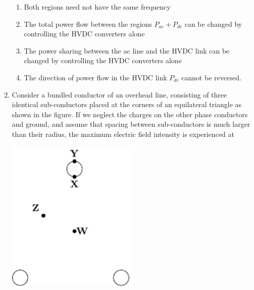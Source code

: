 \documentclass[journal,12pt,onecolumn]{IEEEtran}
\theoremstyle{remark}
\begin{document}
\begin{enumerate}
\begin{enumerate}
    \item  Both regions need not have the same frequency 
\item The total power flow between the regions $P_{ac} + P_{dc}$ can be changed by controlling the HVDC converters alone 
\item The power sharing between the ac line and the HVDC link can be changed by controlling the HVDC converters alone 
\item The direction of power flow in the HVDC link $P_{dc}$ cannot be reversed.\\
\end{enumerate}
\item Consider a bundled conductor of an overhead line, consisting of three identical sub-conductors placed at the corners of an equilateral triangle as shown in the figure. If we neglect the charges on the other phase conductors and ground, and assume that spacing between sub-conductors is much larger than their radius, the maximum electric field intensity is experienced at
	 \begin{center}
\includegraphics[width=0.5\textwidth]{figs/fig6/main} %
\end{center}


\end{enumerate}
\end{document}
